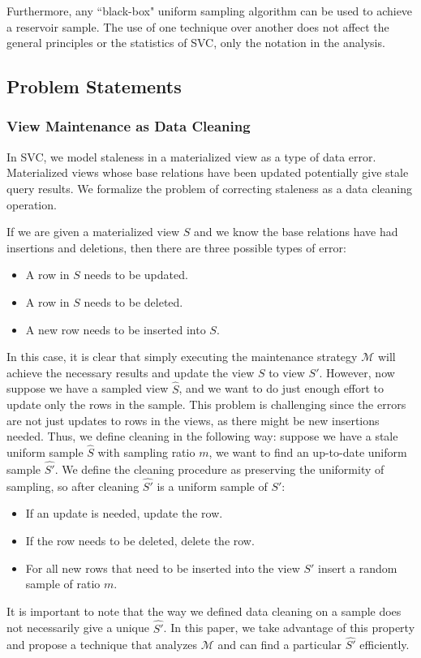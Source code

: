 Furthermore, any ``black-box" uniform sampling algorithm can be used to achieve a reservoir sample.
The use of one technique over another does not affect the general principles or the statistics of SVC, only the 
notation in the analysis.

\subsection{Problem Statements}
\subsubsection{View Maintenance as Data Cleaning}
In SVC, we model staleness in a materialized view as a type of data error.
Materialized views whose base relations have been updated potentially give stale query results.
We formalize the problem of correcting staleness as a data cleaning operation.

If we are given a materialized view $S$ and we know the base relations have had insertions and deletions, then there are three possible types of error:
\begin{itemize}
\item A row in $S$ needs to be updated.
\item A row in $S$ needs to be deleted.
\item A new row needs to be inserted into $S$.
\end{itemize}

In this case, it is clear that simply executing the maintenance strategy $\mathcal{M}$ will achieve the necessary results and update the view $S$ to view $S'$.
However, now suppose we have a sampled view $\hat{S}$, and we want to do just enough effort to update only the rows in the sample.
This problem is challenging since the errors are not just updates to rows in the views, as there might be new insertions needed.
Thus, we define cleaning in the following way: suppose we have a stale uniform sample $\hat{S}$ with sampling ratio $m$, we want to find an up-to-date uniform sample $\hat{S'}$.
We define the cleaning procedure as preserving the uniformity of sampling, so after cleaning $\hat{S'}$ is a uniform sample of $S'$:
\begin{itemize}
\item If an update is needed, update the row.
\item If the row needs to be deleted, delete the row.
\item For all new rows that need to be inserted into the view $S'$ insert a random sample of ratio $m$.
\end{itemize}
It is important to note that the way we defined data cleaning on a sample does not necessarily give a unique $\hat{S'}$. 
In this paper, we take advantage of this property and propose a technique that analyzes $\mathcal{M}$ and can find a particular $\hat{S'}$
efficiently.

